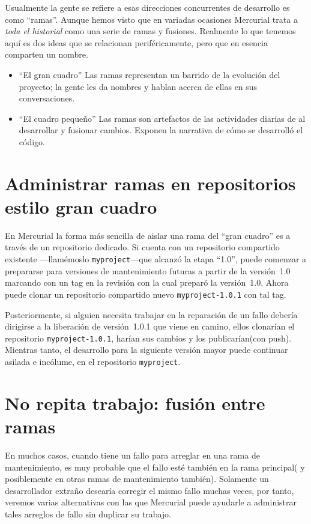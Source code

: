 Usualmente la gente se refiere a esas direcciones
concurrentes de desarrollo es como ``ramas''.  Aunque hemos visto que
en variadas ocasiones Mercurial trata a \emph{toda el historial} como
una serie de ramas y fusiones.  Realmente lo que tenemos aquí es dos
ideas que se relacionan periféricamente, pero que en esencia comparten
un nombre.
\begin{itemize}
\item ``El gran cuadro'' Las ramas representan un barrido de la
  evolución del proyecto; la gente les da nombres y hablan acerca de
  ellas en sus conversaciones.
\item ``El cuadro pequeño'' Las ramas son artefactos de las
  actividades diarias de al desarrollar y fusionar cambios. Exponen la
  narrativa de cómo se desarrolló el código.
\end{itemize}

\section{Administrar ramas en repositorios estilo gran cuadro}

En Mercurial la forma más sencilla de aislar una rama del ``gran
cuadro'' es a través de un repositorio dedicado.  Si cuenta con un
repositorio compartido existente ---llamémoslo
\texttt{myproject}---que alcanzó la etapa ``1.0'', puede comenzar a
prepararse para versiones de mantenimiento futuras a partir de la
versión~1.0 marcando con un tag en la revisión con la cual preparó la versión~1.0.
Ahora puede clonar un repositorio compartido nuevo
\texttt{myproject-1.0.1} con tal tag.

Posteriormente, si alguien necesita trabajar en la reparación de un
fallo debería dirigirse a la liberación de versión~1.0.1 que viene en
camino, ellos clonarían el repositorio \texttt{myproject-1.0.1},
harían sus cambios y los publicarían(con push).
Mientras tanto, el desarrollo para la siguiente versión mayor puede
continuar asilada e incólume, en el repositorio \texttt{myproject}.

\section{No repita trabajo: fusión entre ramas}

En muchos casos, cuando tiene un fallo para arreglar en una rama de
mantenimiento, es muy probable que el fallo esté también en la rama
principal( y posiblemente en otras ramas de mantenimiento
también). Solamente un desarrollador extraño desearía corregir el
mismo fallo muchas veces, por tanto, veremos varias alternativas con
las que Mercurial puede ayudarle a administrar tales arreglos de fallo
sin duplicar su trabajo.

